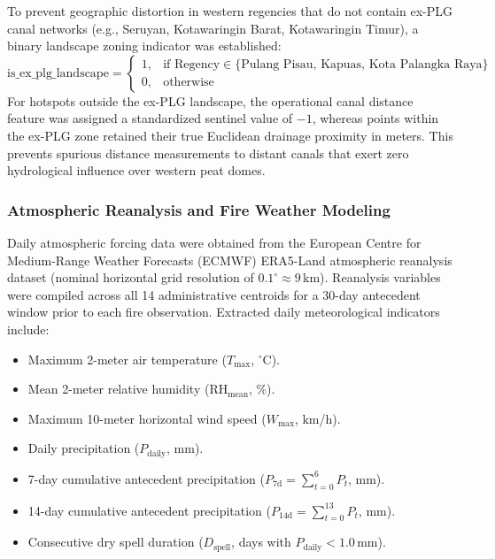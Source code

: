 To prevent geographic distortion in western regencies that do not contain ex-PLG canal networks (e.g., Seruyan, Kotawaringin Barat, Kotawaringin Timur), a binary landscape zoning indicator was established:
\begin{equation}
\text{is\_ex\_plg\_landscape} = \begin{cases} 
1, & \text{if Regency} \in \{\text{Pulang Pisau, Kapuas, Kota Palangka Raya}\} \\ 
0, & \text{otherwise} 
\end{cases}
\label{eq:ex_plg}
\end{equation}
For hotspots outside the ex-PLG landscape, the operational canal distance feature was assigned a standardized sentinel value of $-1$, whereas points within the ex-PLG zone retained their true Euclidean drainage proximity in meters. This prevents spurious distance measurements to distant canals that exert zero hydrological influence over western peat domes.

\subsubsection{Atmospheric Reanalysis and Fire Weather Modeling}
\label{subsubsec:weather_era5}

Daily atmospheric forcing data were obtained from the European Centre for Medium-Range Weather Forecasts (ECMWF) ERA5-Land atmospheric reanalysis dataset (nominal horizontal grid resolution of $0.1^\circ \approx 9$\,km). Reanalysis variables were compiled across all 14 administrative centroids for a 30-day antecedent window prior to each fire observation. Extracted daily meteorological indicators include:
\begin{itemize}
    \item Maximum 2-meter air temperature ($T_{\text{max}}$, $^\circ\text{C}$).
    \item Mean 2-meter relative humidity ($\text{RH}_{\text{mean}}$, \%).
    \item Maximum 10-meter horizontal wind speed ($W_{\text{max}}$, km/h).
    \item Daily precipitation ($P_{\text{daily}}$, mm).
    \item 7-day cumulative antecedent precipitation ($P_{\text{7d}} = \sum_{t=0}^{6} P_{t}$, mm).
    \item 14-day cumulative antecedent precipitation ($P_{\text{14d}} = \sum_{t=0}^{13} P_{t}$, mm).
    \item Consecutive dry spell duration ($D_{\text{spell}}$, days with $P_{\text{daily}} < 1.0$\,mm).
\end{itemize}


